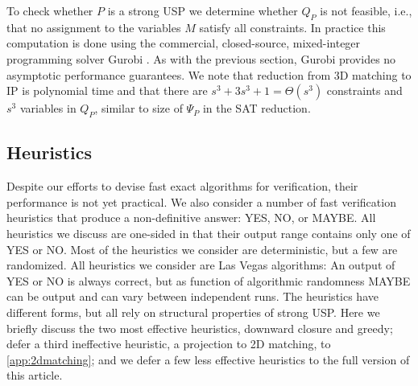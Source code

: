 \documentclass[11pt]{article}
\begin{document}
To check whether $P$ is a strong USP we determine whether $Q_P$ is not feasible,
i.e., that no
assignment to the variables $M$ satisfy all constraints.  In
practice this computation is done using the commercial, closed-source, mixed-integer
programming solver Gurobi \cite{gurobi}.
As with the previous section, Gurobi provides no asymptotic performance
guarantees.  We note that reduction from
3D matching to IP is polynomial time and that there are $s^3 + 3s^3 + 1 = \Theta(s^3)$
constraints and $s^3$ variables in $Q_P$, similar to size of $\Psi_P$ in the SAT reduction.
 
\label{subsec:mip}




\subsection{Heuristics}
\label{sec:heuristic}

Despite our efforts to devise fast exact algorithms for verification,
their performance is not yet practical.  We also consider a number of
fast verification heuristics that produce a non-definitive answer:
YES, NO, or MAYBE.  All heuristics we discuss are one-sided
in that their output range contains only one of YES or NO.
Most of the heuristics we consider are deterministic, but a few are
randomized.  All heuristics we consider are Las Vegas algorithms: An
output of YES or NO is always correct, but as function of algorithmic
randomness MAYBE can be output and can vary between independent runs.
The heuristics have different forms, but all rely on structural
properties of strong USP.  Here we briefly discuss the two most
effective heuristics, downward closure and greedy; defer a third
ineffective heuristic, a projection to 2D matching, to
\autoref{app:2dmatching}; and we defer a few less effective heuristics to
the full version of this article.
\end{document}
